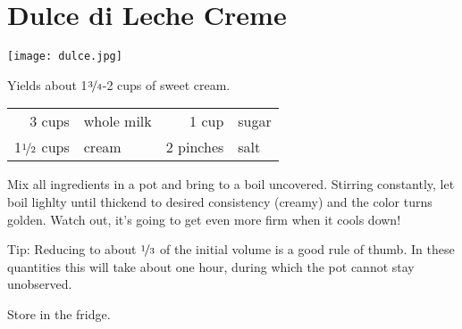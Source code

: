 
\section{Dulce di Leche Creme}
\begin{minipage}{0.45\textwidth}
  \flushleft
  \texttt{[image: dulce.jpg]}
\end{minipage}
\begin{minipage}{0.55\textwidth}
Yields about 1$\nicefrac{3}{4}$-2 cups of sweet cream.
\begin{table}[H]
\centering
\begin{tabular*}{1\textwidth}{rlrl}
3 cups  & whole milk & 1 cup & sugar \\
1$\nicefrac{1}{2}$ cups & cream & 2 pinches & salt \\
\end{tabular*}
\end{table}
\end{minipage}
\begin{Notes}
\item Mix all ingredients in a pot and bring to a boil uncovered. Stirring constantly, let boil lighlty until thickend to desired consistency (creamy) and the color turns golden. Watch out, it's going to get even more firm when it cools down!
\item Tip: Reducing to about $\nicefrac{1}{3}$ of the initial volume is a good rule of thumb. In these quantities this will take about one hour, during which the pot cannot stay unobserved.
\item Store in the fridge.
\end{Notes}
\newpage
